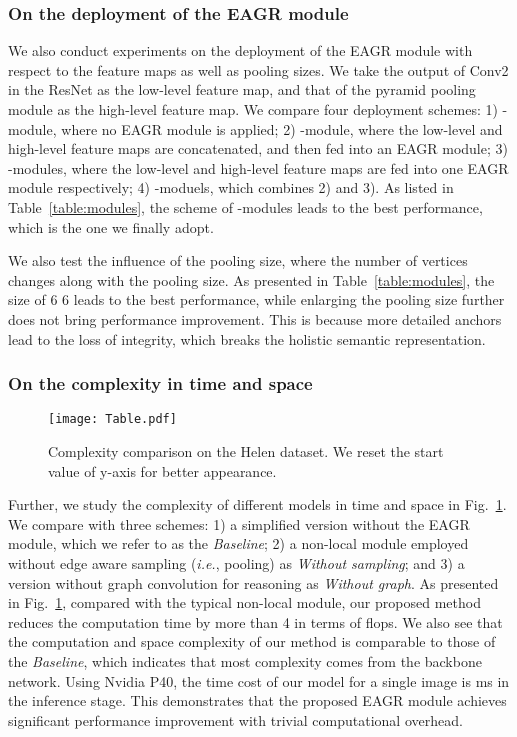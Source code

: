 \documentclass[runningheads]{llncs}
\def\ie{{\it i.e.}}
\begin{document}
\subsubsection{On the deployment of the EAGR module}

We also conduct experiments on the deployment of the EAGR module with respect to the feature maps as well as pooling sizes. 
We take the output of Conv2 in the ResNet as the low-level feature map, and that of the pyramid pooling module as the high-level feature map.  
We compare four deployment schemes: 1) -module, where no EAGR module is applied; 
2) -module, where the low-level and high-level feature maps are concatenated, and then fed into an EAGR module;
3) -modules, where the low-level and high-level feature maps are fed into one EAGR module respectively;
4) -moduels, which combines 2) and 3).   
As listed in Table~\ref{table:modules}, the scheme of -modules leads to the best performance, which is the one we finally adopt. 

We also test the influence of the pooling size, where the number of vertices changes along with the pooling size. 
As presented in Table~\ref{table:modules}, the size of 6  6 leads to the best performance, while enlarging the pooling size further does not bring performance improvement. 
This is because more detailed anchors lead to the loss of integrity, which breaks the holistic semantic representation.

\subsubsection{On the complexity in time and space}
\begin{figure}[t]
    \centering
    \texttt{[image: Table.pdf]}
    \caption{Complexity comparison on the Helen dataset. We reset the start value of y-axis for better appearance.}
    \label{fig:table}
\end{figure}

Further, we study the complexity of different models in time and space in Fig.~\ref{fig:table}. We compare with three schemes: 
1) a simplified version without the EAGR module, which we refer to as the \textit{Baseline}; 
2) a non-local module \cite{wang2018non} employed without edge aware sampling (\ie, pooling) as \textit{Without sampling}; and 
3) a version without graph convolution for reasoning as \textit{Without graph}. 
As presented in Fig.~\ref{fig:table}, compared with the typical non-local module, our proposed method reduces the computation time by more than 4 in terms of flops. 
We also see that the computation and space complexity of our method is comparable to those of the \textit{Baseline}, which indicates that most complexity comes from the backbone network.  Using Nvidia P40, the time cost of our model for a single image is ms in the inference stage. 
This demonstrates that the proposed EAGR module achieves significant performance improvement with trivial computational overhead. 
\end{document}
